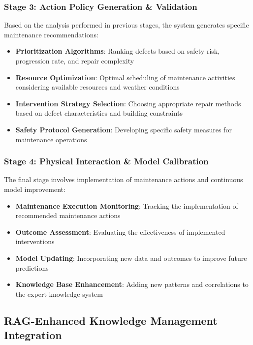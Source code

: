 \subsubsection{Stage 3: Action Policy Generation \& Validation}

Based on the analysis performed in previous stages, the system generates specific maintenance recommendations:

\begin{itemize}
    \item \textbf{Prioritization Algorithms}: Ranking defects based on safety risk, progression rate, and repair complexity
    \item \textbf{Resource Optimization}: Optimal scheduling of maintenance activities considering available resources and weather conditions
    \item \textbf{Intervention Strategy Selection}: Choosing appropriate repair methods based on defect characteristics and building constraints
    \item \textbf{Safety Protocol Generation}: Developing specific safety measures for maintenance operations
\end{itemize}

\subsubsection{Stage 4: Physical Interaction \& Model Calibration}

The final stage involves implementation of maintenance actions and continuous model improvement:

\begin{itemize}
    \item \textbf{Maintenance Execution Monitoring}: Tracking the implementation of recommended maintenance actions
    \item \textbf{Outcome Assessment}: Evaluating the effectiveness of implemented interventions
    \item \textbf{Model Updating}: Incorporating new data and outcomes to improve future predictions
    \item \textbf{Knowledge Base Enhancement}: Adding new patterns and correlations to the expert knowledge system
\end{itemize}

\subsection{RAG-Enhanced Knowledge Management Integration}

